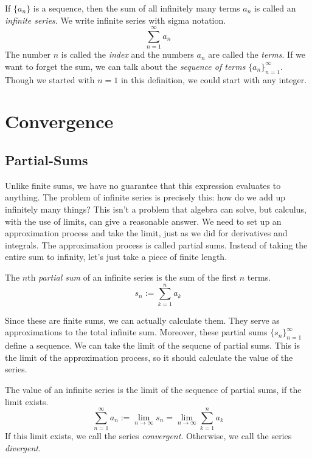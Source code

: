 \documentclass[fleqn]{report}
\begin{document}
\begin{defn}If $\{a_n\}$ is a sequence, then the sum of all
infinitely many terms $a_n$ is called an \emph{infinite series}.
We write infinite series with sigma notation.
\begin{equation*}
\sum_{n=1}^\infty a_n 
\end{equation*}
The number $n$
is called the \emph{index} and the numbers $a_n$ are called
the \emph{terms}. If we want to forget the sum, we can talk
about the \emph{sequence of terms} $\{a_n\}_{n=1}^\infty$.
Though we started with $n=1$ in this definition, we could
start with any integer.
\end{defn}

\section{Convergence}
\label{series-convergence}

\subsection{Partial-Sums}
\label{partial-sums}

Unlike finite sums, we have no guarantee that this expression
evaluates to anything. The problem of infinite series is
precisely this: how do we add up infinitely many things? This
isn't a problem that algebra can solve, but calculus, with the
use of limits, can give a reasonable answer. We need to set
up an approximation process and take the limit, just as we did
for derivatives and integrals. The approximation process is
called partial sums. Instead of taking the entire sum to
infinity, let's just take a piece of finite length. 

\begin{defn}The $n$th \emph{partial sum} of an
infinite series is the sum of the first $n$ terms.
\begin{equation*}
s_n := \sum_{k=1}^n a_k
\end{equation*}\end{defn}
Since these are finite sums, we can actually calculate them.
They serve as approximations to the total infinite sum. 
Moreover, these partial sums $\{s_n\}_{n=1}^\infty$ define a
sequence. We can take the limit of the sequcne of partial
sums. This is the limit of the approximation process, so it
should calculate the value of the series. 

\begin{defn} The value of an infinite series is the limit of
the sequence of partial sums, if the limit exists. 
\begin{equation*}
\sum_{n=1}^\infty a_n := \lim_{n \rightarrow \infty} s_n =
\lim_{n \rightarrow \infty} \sum_{k=1}^n a_k
\end{equation*} 
If this limit exists, we call the series \emph{convergent}.
Otherwise, we call the series \emph{divergent}.
\end{defn}
\end{document}
